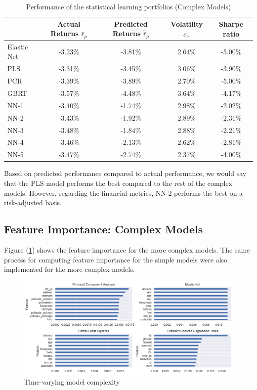 \begin{table}[ht]
	\centering
	\caption{Performance of the statistical learning portfolios (Complex Models)}
	\begin{tabular}[t]{lcccc}
		\toprule
		&Actual Returns $\bar{r}_{p}$&Predicted Returns $\hat{\bar{r}}_{p}$&Volatility $\sigma_r$ & Sharpe ratio \\
		\midrule
		Elastic Net &-3.23\%&-3.81\%&2.64\%&-5.00\%\\		
		PLS &-3.31\%&-3.45\%&3.06\%&-3.90\%\\
		PCR &-3.39\%&-3.89\%&2.70\%&-5.00\%\\
		GBRT &-3.57\%&-4.48\%&3.64\%&-4.17\%\\
		NN-1 &-3.40\%&-1.74\%&2.98\%&-2.02\%\\
		NN-2 &-3.43\%&-1.92\%&2.89\%&-2.31\%\\
		NN-3 &-3.48\%&-1.84\%&2.88\%&-2.21\%\\
		NN-4 &-3.46\%&-2.13\%&2.62\%&-2.81\%\\
		NN-5&-3.47\%&-2.74\%&2.37\%&-4.00\%\\
		\bottomrule
	\end{tabular}\label{tab:portolio_complex}
\end{table}
Based on predicted performance compared to actual performance, we would say that the PLS model performs the best compared to the rest of the complex models. However, regarding the financial metrics, NN-2 performs the best on a risk-adjusted basis.

\subsection{Feature Importance: Complex Models}

Figure (\ref{fig:feat_complex}) shows the feature importance for the more complex models. The same process for computing feature importance for the simple models were also implemented for the more complex models.

\begin{figure}[h]\label{fig:feat_complex}
	\centering
	\includegraphics[width=17cm]{content/images/feature_complex}
	\caption{Time-varying model complexity}
\end{figure}

